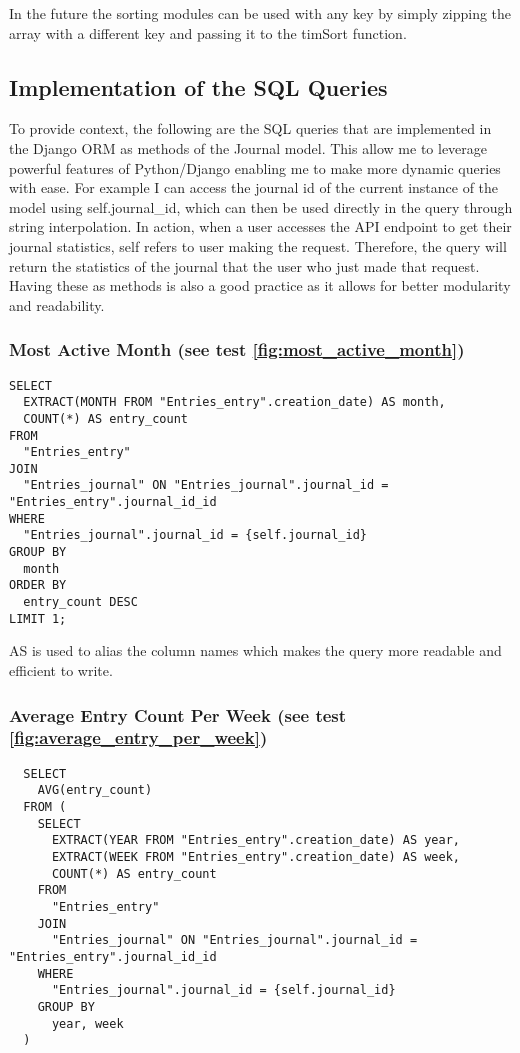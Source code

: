 In the future the sorting modules can be used with any key by simply zipping the array with a different key and passing it to the timSort function. 


\subsection{Implementation of the SQL Queries}
To provide context, the following are the SQL queries that are implemented in the Django ORM as methods of the Journal model. This allow me to leverage powerful features of Python/Django enabling me to make more dynamic queries with ease. For example I can access the journal id of the current instance of the model using self.journal\_id, which can then be used directly in the query through string interpolation. In action, when a user accesses the API endpoint to get their journal statistics, self refers to user making the request. Therefore, the query will return the statistics of the journal that the user who just made that request. Having these as methods is also a good practice as it allows for better modularity and readability.


\subsubsection{Most Active Month (see test \ref{fig:most_active_month})}
\begin{verbatim}
SELECT
  EXTRACT(MONTH FROM "Entries_entry".creation_date) AS month,
  COUNT(*) AS entry_count
FROM
  "Entries_entry"
JOIN
  "Entries_journal" ON "Entries_journal".journal_id = "Entries_entry".journal_id_id
WHERE
  "Entries_journal".journal_id = {self.journal_id}
GROUP BY
  month
ORDER BY
  entry_count DESC
LIMIT 1;
\end{verbatim}

AS is used to alias the column names which makes the query more readable and efficient to write.

\subsubsection{Average Entry Count Per Week (see test \ref{fig:average_entry_per_week})}
\begin{verbatim}
  SELECT
    AVG(entry_count)
  FROM (
    SELECT
      EXTRACT(YEAR FROM "Entries_entry".creation_date) AS year,
      EXTRACT(WEEK FROM "Entries_entry".creation_date) AS week,
      COUNT(*) AS entry_count
    FROM
      "Entries_entry"
    JOIN
      "Entries_journal" ON "Entries_journal".journal_id = "Entries_entry".journal_id_id
    WHERE
      "Entries_journal".journal_id = {self.journal_id}
    GROUP BY
      year, week
  )
\end{verbatim}

